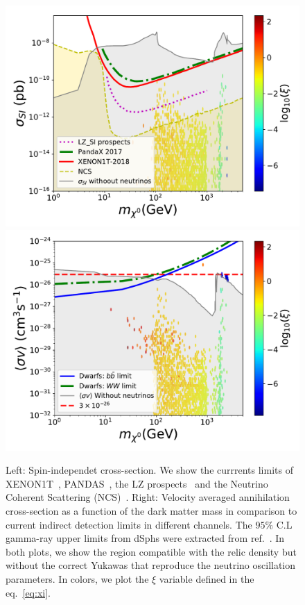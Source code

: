 \documentclass[12pt,letterpaper]{article}
\begin{document}
\begin{figure}
\begin{center}
\includegraphics[scale=0.43]{sigmaSI_with_neutrino_physics}
\includegraphics[scale=0.43]{sigmav_with_neutrino_physics}
\caption{Left: Spin-independet cross-section. We show the currrents limits of XENON1T~\cite{Aprile:2018dbl}, PANDAS~\cite{Cui:2017nnn}, the LZ prospects~\cite{Mount:2017qzi} and the Neutrino Coherent Scattering (NCS)~\cite{Cushman:2013zza, Billard:2013qya}. 
Right:  Velocity averaged annihilation cross-section as a function of the dark matter
mass in comparison to current indirect detection limits in different channels. The $95\%$ C.L gamma-ray upper limits from dSphs were extracted from ref.~\cite{Ackermann:2015zua}.
In both plots, we show  the region compatible with the relic density but without the correct Yukawas that reproduce the neutrino oscillation parameters. In colors, we plot the $\xi$ variable defined in the eq.~\ref{eq:xi}.
}
\label{fig:SI-and-sv-with-neutrinos-scan}
\end{center}
\end{figure}
\end{document}
